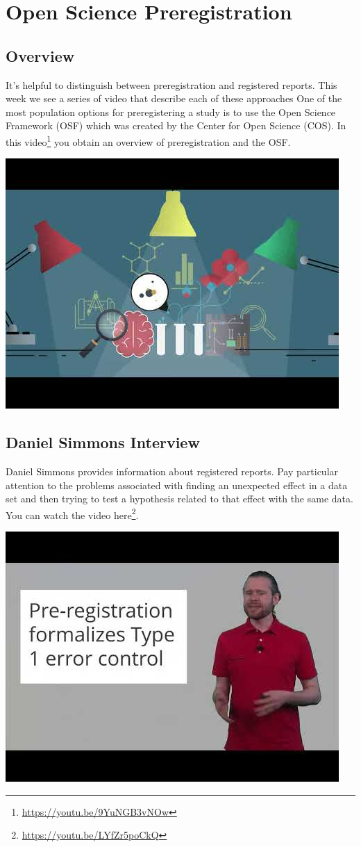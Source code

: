 \documentclass[
]{krantz}
\renewcommand{\href}[2]{#2\footnote{\url{#1}}}
\begin{document}
\hypertarget{open-science-preregistration}{%
\chapter{Open Science Preregistration}\label{open-science-preregistration}}

\hypertarget{overview-10}{%
\section{Overview}\label{overview-10}}

It's helpful to distinguish between preregistration and registered reports. This week we see a series of video that describe each of these approaches One of the most population options for preregistering a study is to use the Open Science Framework (OSF) which was created by the Center for Open Science (COS). In this \href{https://youtu.be/9YuNGB3vNOw}{video} you obtain an overview of preregistration and the OSF.

\includegraphics[width=0.4\linewidth]{ch_preregistration/images/prereg_overview}

\hypertarget{daniel-simmons-interview}{%
\section{Daniel Simmons Interview}\label{daniel-simmons-interview}}

Daniel Simmons provides information about registered reports. Pay particular attention to the problems associated with finding an unexpected effect in a data set and then trying to test a hypothesis related to that effect with the same data. You can watch the video \href{https://youtu.be/LYfZr5poCkQ}{here}.

\includegraphics[width=0.4\linewidth]{ch_preregistration/images/prereg_ds}
\end{document}
